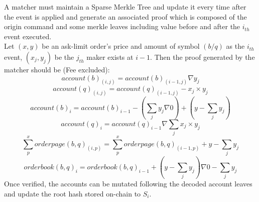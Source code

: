 \documentclass[a4paper,12pt]{article}
\begin{document}
A matcher must maintain a Sparse Merkle Tree and update it every time after the event is applied and generate an associated proof which is composed of the origin command and some merkle leaves including value before and after the \(i_{th}\) event executed.\\
Let \((x, y)\) be an ask-limit order's price and amount of symbol \((b/q)\) as the \(i_{th}\) event, \((x_{j}, y_{j})\) be the \(j_{th}\) maker exists at \(i-1\). Then the proof generated by the matcher should be (Fee excluded):\\
\begin{equation*}
    account(b)_{(i, j)}=account(b)_{(i-1,j)} \nabla y_{j}
\end{equation*}
\begin{equation*}
    account(q)_{(i, j)}=account(q)_{(i-1,j)} - x_{j} \times y_{j}
\end{equation*}
\begin{equation*}
    account(b)_{i}=account(b)_{i-1} - (\sum\limits_{j} y_{j} \nabla 0) + (y - \sum\limits_{j} y_{j})
\end{equation*}
\begin{equation*}
    account(q)_{i}=account(q)_{i-1} \nabla \sum\limits_{j} x_{j} \times y_{j}
\end{equation*}
\begin{equation*}
    \sum\limits_{p}^{x} orderpage(b,q)_{(i, p)} = \sum\limits_{p}^{x} orderpage(b,q)_{(i-1, p)} + y - \sum\limits_{j} y_{j}
\end{equation*}
\begin{equation*}
    orderbook(b,q)_{i}=orderbook(b,q)_{i-1} + (y - \sum\limits_{j} y_{j}) \nabla 0 - \sum\limits_{j} y_{j}
\end{equation*}
Once verified, the accounts can be mutated following the decoded account leaves and update the root hash stored on-chain to \(S_{i}\).\\
\end{document}
